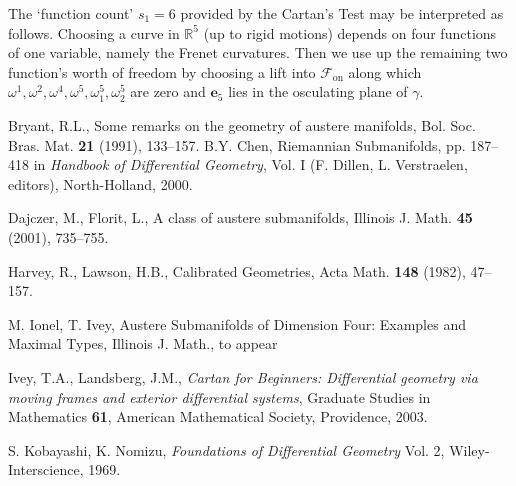 \documentclass[12pt,reqno]{amsart}
\theoremstyle{definition}
\theoremstyle{remark}
\begin{document}
The `function count' $s_1=6$ provided by the Cartan's Test may be interpreted as follows.  Choosing
a curve in ${\mathbb R}^5$ (up to rigid motions) depends on four functions of one variable, namely the Frenet curvatures.
Then we use up the remaining two function's worth of freedom by choosing
a lift into ${{\mathscr F}_{\operatorname{on}}}$ along which ${\omega}^1, {\omega}^2, {\omega}^4, {\omega}^5, {\omega}^5_1, {\omega}^5_2$ are zero
and ${\mathbf e}_5$ lies in the osculating plane of $\gamma$.

\begin{thebibliography}{10}

Bryant, R.L., {\sf Some remarks on the geometry of austere manifolds},
Bol. Soc. Bras. Mat. {\bf 21} (1991), 133--157.
 B.Y. Chen, {\sf Riemannian Submanifolds}, pp. 187--418 in
{\it Handbook of Differential Geometry}, Vol. I (F. Dillen, L. Verstraelen, editors),
North-Holland, 2000.

Dajczer, M., Florit, L., {\sf A class of austere submanifolds},
Illinois J. Math. {\bf 45} (2001), 735--755.

Harvey, R., Lawson, H.B., {\sf Calibrated Geometries}, Acta Math. {\bf 148} (1982), 47--157.

M. Ionel, T. Ivey, {\sf Austere Submanifolds of Dimension Four:  Examples and Maximal Types},
Illinois J. Math., to appear

Ivey, T.A., Landsberg, J.M.,
{\it Cartan for Beginners: Differential geometry via moving frames and
exterior differential systems}, Graduate Studies in Mathematics {\bf 61}, American Mathematical Society,
Providence, 2003.

 S. Kobayashi, K. Nomizu, {\it Foundations of Differential Geometry} Vol. 2,
Wiley-Interscience, 1969.

\end{thebibliography}
\end{document}
